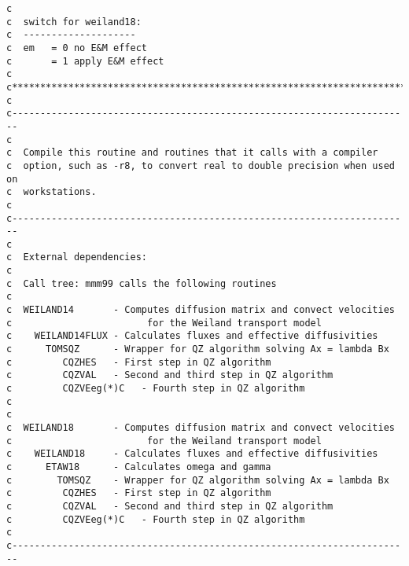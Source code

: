 \begin{verbatim}
c
c  switch for weiland18:
c  --------------------
c  em   = 0 no E&M effect 
c       = 1 apply E&M effect 
c 
c***********************************************************************
c
c-----------------------------------------------------------------------
c
c  Compile this routine and routines that it calls with a compiler
c  option, such as -r8, to convert real to double precision when used on
c  workstations.
c
c-----------------------------------------------------------------------
c
c  External dependencies:
c
c  Call tree: mmm99 calls the following routines
c
c  WEILAND14       - Computes diffusion matrix and convect velocities
c                        for the Weiland transport model
c    WEILAND14FLUX - Calculates fluxes and effective diffusivities
c      TOMSQZ      - Wrapper for QZ algorithm solving Ax = lambda Bx
c         CQZHES   - First step in QZ algorithm
c         CQZVAL   - Second and third step in QZ algorithm
c         CQZVEeg(*)C   - Fourth step in QZ algorithm
c
c
c  WEILAND18       - Computes diffusion matrix and convect velocities
c                        for the Weiland transport model
c    WEILAND18     - Calculates fluxes and effective diffusivities
c      ETAW18      - Calculates omega and gamma
c        TOMSQZ    - Wrapper for QZ algorithm solving Ax = lambda Bx
c         CQZHES   - First step in QZ algorithm
c         CQZVAL   - Second and third step in QZ algorithm
c         CQZVEeg(*)C   - Fourth step in QZ algorithm
c
c-----------------------------------------------------------------------


\end{verbatim}
